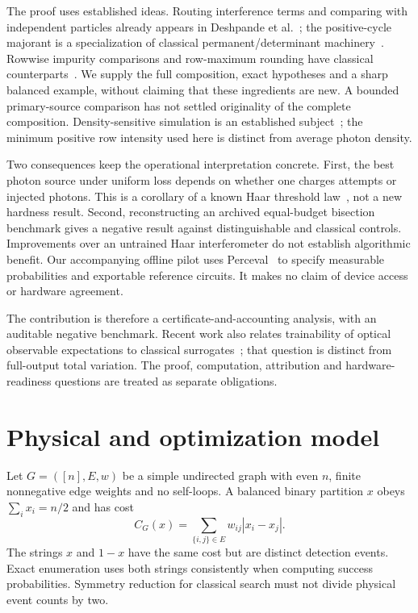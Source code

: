 \documentclass[11pt,a4paper]{article}
\theoremstyle{remark}\newtheorem{remark}[theorem]{Remark}
\begin{document}
The proof uses established ideas. Routing interference terms and comparing with independent particles already appears in Deshpande et al.~\cite{deshpande2018}; the positive-cycle majorant is a specialization of classical permanent/determinant machinery~\cite{etingof2006}. Rowwise impurity comparisons and row-maximum rounding have classical counterparts~\cite{rioul2023,jiang2019}. We supply the full composition, exact hypotheses and a sharp balanced example, without claiming that these ingredients are new. A bounded primary-source comparison has not settled originality of the complete composition. Density-sensitive simulation is an established subject~\cite{shchesnovich2021}; the minimum positive row intensity used here is distinct from average photon density.

Two consequences keep the operational interpretation concrete. First, the best photon source under uniform loss depends on whether one charges attempts or injected photons. This is a corollary of a known Haar threshold law~\cite{bouland2023}, not a new hardness result. Second, reconstructing an archived equal-budget bisection benchmark gives a negative result against distinguishable and classical controls. Improvements over an untrained Haar interferometer do not establish algorithmic benefit. Our accompanying offline pilot uses Perceval~\cite{heurtel2023} to specify measurable probabilities and exportable reference circuits. It makes no claim of device access or hardware agreement.

The contribution is therefore a certificate-and-accounting analysis, with an auditable negative benchmark. Recent work also relates trainability of optical observable expectations to classical surrogates~\cite{monbroussou2026}; that question is distinct from full-output total variation. The proof, computation, attribution and hardware-readiness questions are treated as separate obligations.

\section{Physical and optimization model}\label{sec:model}
Let $G=([n],E,w)$ be a simple undirected graph with even $n$, finite nonnegative edge weights and no self-loops. A balanced binary partition $x$ obeys $\sum_i x_i=n/2$ and has cost
\begin{equation}
 C_G(x)=\sum_{\{i,j\}\in E}w_{ij}|x_i-x_j|.\label{eq:cut}
\end{equation}
The strings $x$ and $1-x$ have the same cost but are distinct detection events. Exact enumeration uses both strings consistently when computing success probabilities. Symmetry reduction for classical search must not divide physical event counts by two.
\end{document}
